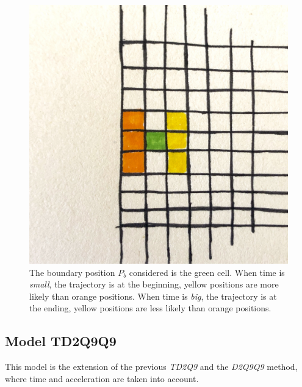 \documentclass[class=article, crop=false]{standalone}
\begin{document}
\begin{figure}[h]
\centering
\includegraphics[scale=0.1]{draw/Boundary_position_in_out}
\captionsetup{width=.6\linewidth}
\caption{The boundary position $P_b$ considered is the green cell.
When time is \emph{small}, the trajectory is at the beginning, yellow positions are more likely than orange positions.
When time is \emph{big}, the trajectory is at the ending, yellow positions are less likely than orange positions.}
\label{fig:boundary_position}
\end{figure}


\FloatBarrier
\newpage
\subsection{Model TD2Q9Q9}
This model is the extension of the previous \emph{TD2Q9} and the \emph{D2Q9Q9} method, where time and acceleration are taken into account.
\end{document}
